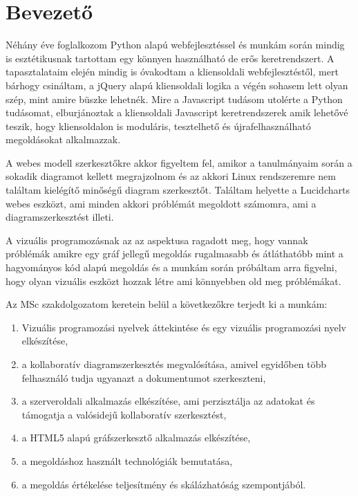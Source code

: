 \chapter*{Bevezető}

Néhány éve foglalkozom Python alapú webfejlesztéssel és munkám során mindig is esztétikusnak tartottam egy könnyen használható de erős keretrendszert. A tapasztalataim elején mindig is óvakodtam a kliensoldali webfejlesztéstől, mert bárhogy csináltam, a jQuery alapú kliensoldali logika a végén sohasem lett olyan szép, mint amire büszke lehetnék. Mire a Javascript tudásom utolérte a Python tudásomat, elburjánoztak a kliensoldali Javascript keretrendszerek amik lehetővé teszik, hogy kliensoldalon is moduláris, tesztelhető és újrafelhasználható megoldásokat alkalmazzak.

A webes modell szerkesztőkre akkor figyeltem fel, amikor a tanulmányaim során a sokadik diagramot kellett megrajzolnom és az akkori Linux rendszeremre nem találtam kielégítő minőségű diagram szerkesztőt. Találtam helyette a Lucidcharts webes eszközt, ami minden akkori próblémát megoldott számomra, ami a diagramszerkesztést illeti.

A vizuális programozásnak az az aspektusa ragadott meg, hogy vannak próblémák amikre egy gráf jellegű megoldás rugalmasabb és átláthatóbb mint a hagyományos kód alapú megoldás és a munkám során próbáltam arra figyelni, hogy olyan vizuális eszközt hozzak létre ami könnyebben old meg próblémákat.

Az MSc szakdolgozatom keretein belül a következőkre terjedt ki a munkám:
\begin{enumerate}
\item Vizuális programozási nyelvek áttekintése és egy vizuális programozási nyelv elkészítése,
\item a kollaboratív diagramszerkesztés megvalósítása, amivel egyidőben több felhasználó tudja ugyanazt a dokumentumot szerkeszteni,
\item a szerveroldali alkalmazás elkészítése, ami perzisztálja az adatokat és támogatja a valósidejű kollaboratív szerkesztést,
\item a HTML5 alapú gráfszerkesztő alkalmazás elkészítése,
\item a megoldáshoz használt technológiák bemutatása, 
\item a megoldás értékelése teljesítmény és skálázhatóság szempontjából.
\end{enumerate}


